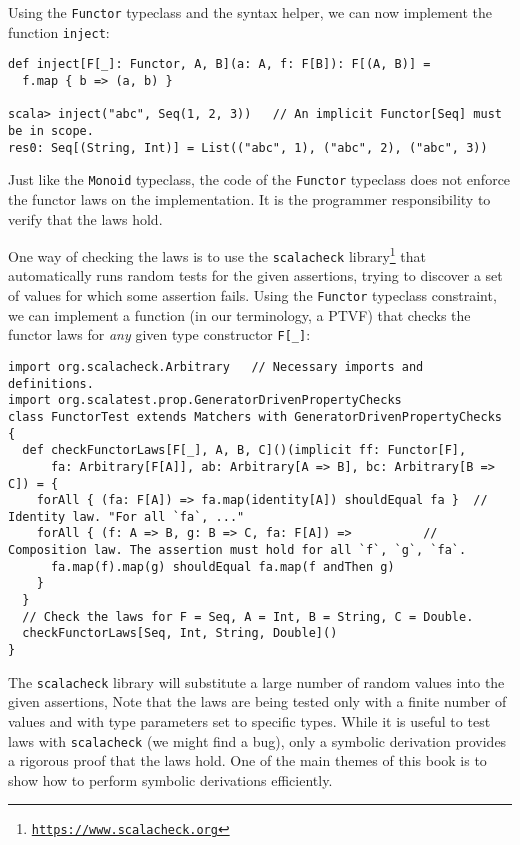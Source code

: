Using the \lstinline!Functor! typeclass and the syntax helper, we
can now implement the function \lstinline!inject!:
\begin{lstlisting}
def inject[F[_]: Functor, A, B](a: A, f: F[B]): F[(A, B)] =
  f.map { b => (a, b) }

scala> inject("abc", Seq(1, 2, 3))   // An implicit Functor[Seq] must be in scope.
res0: Seq[(String, Int)] = List(("abc", 1), ("abc", 2), ("abc", 3))
\end{lstlisting}
 Just like the \lstinline!Monoid! typeclass, the code of the \lstinline!Functor!
typeclass does not enforce the functor laws on the implementation.
It is the programmer responsibility to verify that the laws hold.

One way of checking the laws is to use the \texttt{scalacheck} library\footnote{\texttt{\href{https://www.scalacheck.org}{https://www.scalacheck.org}}}
that automatically runs random tests for the given assertions, trying
to discover a set of values for which some assertion fails. Using
the \lstinline!Functor! typeclass constraint, we can implement a
function (in our terminology, a PTVF) that checks the functor laws
for \emph{any} given type constructor \lstinline!F[_]!:
\begin{lstlisting}
import org.scalacheck.Arbitrary   // Necessary imports and definitions.
import org.scalatest.prop.GeneratorDrivenPropertyChecks
class FunctorTest extends Matchers with GeneratorDrivenPropertyChecks {
  def checkFunctorLaws[F[_], A, B, C]()(implicit ff: Functor[F],
      fa: Arbitrary[F[A]], ab: Arbitrary[A => B], bc: Arbitrary[B => C]) = {
    forAll { (fa: F[A]) => fa.map(identity[A]) shouldEqual fa }  // Identity law. "For all `fa`, ..."
    forAll { (f: A => B, g: B => C, fa: F[A]) =>          // Composition law. The assertion must hold for all `f`, `g`, `fa`.
      fa.map(f).map(g) shouldEqual fa.map(f andThen g)
    }
  }
  // Check the laws for F = Seq, A = Int, B = String, C = Double.
  checkFunctorLaws[Seq, Int, String, Double]()
}
\end{lstlisting}

The \texttt{scalacheck} library will substitute a large number of
random values into the given assertions, Note that the laws are being
tested only with a finite number of values and with type parameters
set to specific types. While it is useful to test laws with \texttt{scalacheck}
(we might find a bug), only a symbolic derivation provides a rigorous
proof that the laws hold. One of the main themes of this book is to
show how to perform symbolic derivations efficiently.


